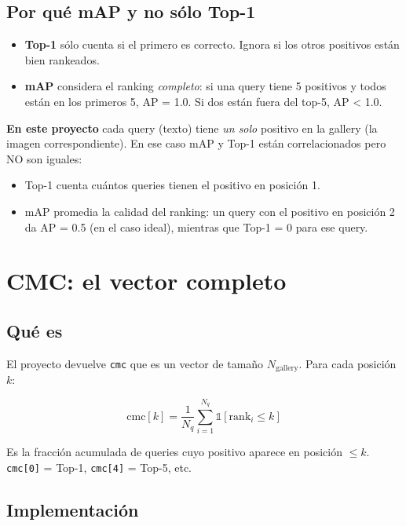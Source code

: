 \subsection*{Por qué mAP y no sólo Top-1}

\begin{itemize}
  \item \textbf{Top-1} sólo cuenta si el primero es correcto.
        Ignora si los otros positivos están bien rankeados.
  \item \textbf{mAP} considera el ranking \emph{completo}: si una
        query tiene 5 positivos y todos están en los primeros 5,
        AP = 1.0. Si dos están fuera del top-5, AP < 1.0.
\end{itemize}

\noindent\textbf{En este proyecto} cada query (texto) tiene
\emph{un solo} positivo en la gallery (la imagen correspondiente).
En ese caso mAP y Top-1 están correlacionados pero NO son
iguales:
\begin{itemize}
  \item Top-1 cuenta cuántos queries tienen el positivo en
        posición 1.
  \item mAP promedia la calidad del ranking: un query con el
        positivo en posición 2 da AP = 0.5 (en el caso ideal),
        mientras que Top-1 = 0 para ese query.
\end{itemize}

\section{CMC: el vector completo}

\subsection*{Qué es}

El proyecto devuelve \texttt{cmc} que es un vector de tamaño
$N_{\text{gallery}}$. Para cada posición $k$:

\begin{equation}
  \text{cmc}[k] = \frac{1}{N_q}
                  \sum_{i=1}^{N_q} \mathbb{1}[\text{rank}_i \leq k]
  \label{eq:cmc}
\end{equation}

\noindent Es la fracción acumulada de queries cuyo positivo
aparece en posición $\leq k$. \texttt{cmc[0]} = Top-1,
\texttt{cmc[4]} = Top-5, etc.

\subsection*{Implementación}

